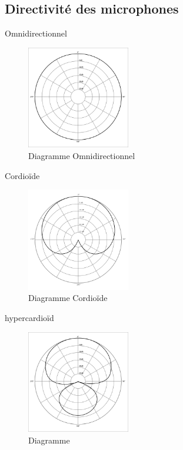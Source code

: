 \documentclass[aspectratio=169]{beamer}
\begin{document}
\subsection{Directivité des microphones}
\begin{frame}{Omnidirectionnel}
	\begin{figure}[!h]
	\begin{center}
	\includegraphics[width=0.4\textwidth]{figure/Polar_pattern_omni.png}
	\end{center}
	\caption{Diagramme Omnidirectionnel}
	\end{figure}
\end{frame}
\begin{frame}{Cordioïde}
	\begin{figure}[!h]
	\begin{center}
	\includegraphics[width=0.4\textwidth]{figure/Polar_pattern_cardioid.png}
	\end{center}
	\caption{Diagramme Cordioïde}
	\end{figure}
\end{frame}
\begin{frame}{hypercardioïd}
	\begin{figure}[!h]
	\begin{center}
	\includegraphics[width=0.4\textwidth]{figure/Polar_pattern_hypercardioid.png}
	\end{center}
	\caption{Diagramme }
	\end{figure}
\end{frame}
\end{document}
